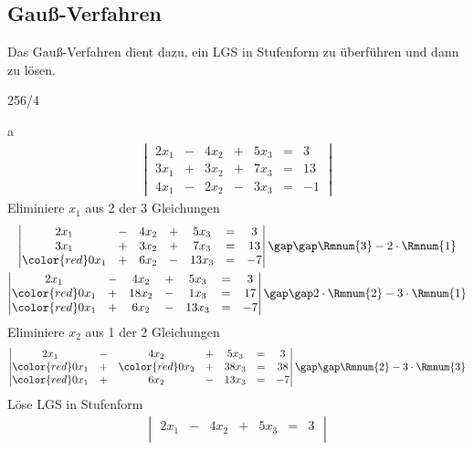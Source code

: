 \subsection{Gauß-Verfahren}
Das Gauß-Verfahren dient dazu, ein LGS in Stufenform zu überführen und dann zu lösen.
\newpage
\begin{exercise}{256/4}
  \item [a]
  \begin{gather*}
    \begin{vmatrix}
      2x_1 & - & 4x_2 & + & 5x_3 & = & 3 \\
      3x_1 & + & 3x_2 & + & 7x_3 & = & 13 \\
      4x_1 & - & 2x_2 & - & 3x_3 & = & -1
    \end{vmatrix}
  \end{gather*}
  Eliminiere $x_1$ aus 2 der 3 Gleichungen
  \begin{gather*}
    \begin{vmatrix}
      2x_1 & - & 4x_2 & + & 5x_3 & = & 3 \\
      3x_1 & + & 3x_2 & + & 7x_3 & = & 13 \\
      {\color{red}0}x_1 & + & 6x_2 & - & 13x_3 & = & -7
    \end{vmatrix}
    \gap\gap \Rmnum{3} - 2 \cdot \Rmnum{1} \\
    \begin{vmatrix}
      2x_1 & - & 4x_2 & + & 5x_3 & = & 3 \\
      {\color{red}0}x_1 & + & 18x_2 & - & 1x_3 & = & 17 \\
      {\color{red}0}x_1 & + & 6x_2 & - & 13x_3 & = & -7
    \end{vmatrix}
    \gap\gap 2 \cdot \Rmnum{2} - 3 \cdot \Rmnum{1}
  \end{gather*}
  Eliminiere $x_2$ aus 1 der 2 Gleichungen
  \begin{gather*}
    \begin{vmatrix}
      2x_1 & - & 4x_2 & + & 5x_3 & = & 3 \\
      {\color{red}0}x_1 & + & {\color{red}0}x_2 & + & 38x_3 & = & 38 \\
      {\color{red}0}x_1 & + & 6x_2 & - & 13x_3 & = & -7
    \end{vmatrix}
    \gap\gap \Rmnum{2} - 3 \cdot \Rmnum{3}
  \end{gather*}
  Löse LGS in Stufenform
  \begin{gather*}
    \begin{vmatrix}
      2x_1 & - & 4x_2 & + & 5x_3 & = & 3 \\

\end{vmatrix}
\end{gather*}
\end{exercise}

